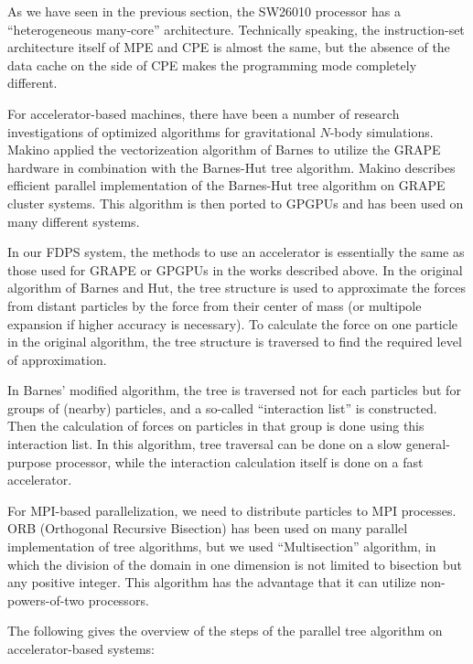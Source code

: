 \documentclass[oribibl]{llncs}
\begin{document}
As we have seen in the previous section, the SW26010 processor has a
``heterogeneous many-core'' architecture. Technically speaking, the
instruction-set architecture itself of MPE and CPE is almost the same,
but the absence of the data cache on the side of CPE makes the
programming mode completely different.

For accelerator-based machines, there have been a number of 
research investigations of 
optimized algorithms for gravitational $N$-body
simulations. Makino \cite{1991PASJ...43..621M} applied the
vectorizeation algorithm of Barnes \cite{1990JCoPh..87..161B} to
utilize the GRAPE hardware in combination with the Barnes-Hut tree
algorithm. Makino \cite{2004PASJ...56..521M} describes efficient
parallel implementation of the Barnes-Hut tree algorithm on GRAPE cluster
systems. This algorithm is then ported to GPGPUs \cite{Hamadaetal2009}
and has been used on many different systems.

In our FDPS system, the methods to use an accelerator is essentially the
same as those used for GRAPE or GPGPUs in the works described above.
In the original algorithm of Barnes and Hut, the tree structure is
used to approximate the forces from distant particles by the force
from their center of mass (or multipole expansion if higher accuracy
is necessary). To calculate the force on one particle in the original
algorithm, the tree structure is traversed to find the required level of
approximation.

In Barnes' modified algorithm, the tree is traversed not for each
particles but for groups of (nearby) particles, and a so-called
``interaction list'' is constructed. Then the calculation of forces on
particles in that group is done using this interaction list. In this
algorithm, tree traversal can be done on a slow general-purpose
processor, while the interaction calculation itself is done on a fast
accelerator.

For MPI-based parallelization, we need to distribute particles to MPI
processes. ORB (Orthogonal Recursive Bisection) has been used on many
parallel implementation of tree algorithms, but we used
``Multisection'' algorithm, in which the division of the domain in one
dimension is not limited to bisection but any positive integer. This
algorithm has the advantage that it can utilize non-powers-of-two
processors.

The following gives the overview of the steps of the parallel tree
algorithm on accelerator-based systems:
\end{document}
